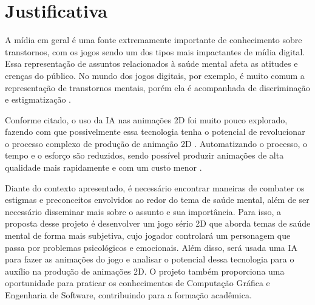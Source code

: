 \chapter{Justificativa}
\label{c.justificativa}

 A mídia em geral é uma fonte extremamente importante de conhecimento sobre transtornos, com os jogos sendo um dos tipos mais impactantes de mídia digital. Essa representação de assuntos relacionados à saúde mental afeta as atitudes e crenças do público. No mundo dos jogos digitais, por exemplo, é muito comum a representação de transtornos mentais, porém ela é acompanhada de discriminação e estigmatização \cite{kasdorf_2023}. 

 Conforme citado, o uso da IA nas animações 2D foi muito pouco explorado, fazendo com que possivelmente essa tecnologia tenha o potencial de revolucionar o processo complexo de produção de animação 2D \cite{articleIAanima}. Automatizando o processo, o tempo e o esforço são reduzidos, sendo possível produzir animações de alta qualidade mais rapidamente e com um custo menor \cite{xian2023automated}.

Diante do contexto apresentado, é necessário encontrar maneiras de combater os estigmas e preconceitos envolvidos ao redor do tema de saúde mental, além de ser necessário disseminar mais sobre o assunto e sua importância. Para isso, a proposta desse projeto é desenvolver um jogo sério 2D que aborda temas de saúde mental de forma mais subjetiva, cujo jogador controlará um personagem que passa por problemas psicológicos e emocionais. Além disso, será usada uma IA para fazer as animações do jogo e analisar o potencial dessa tecnologia para o auxílio na produção de animações 2D. O projeto também proporciona uma oportunidade para praticar os conhecimentos de Computação Gráfica e Engenharia de Software, contribuindo para a formação acadêmica.

